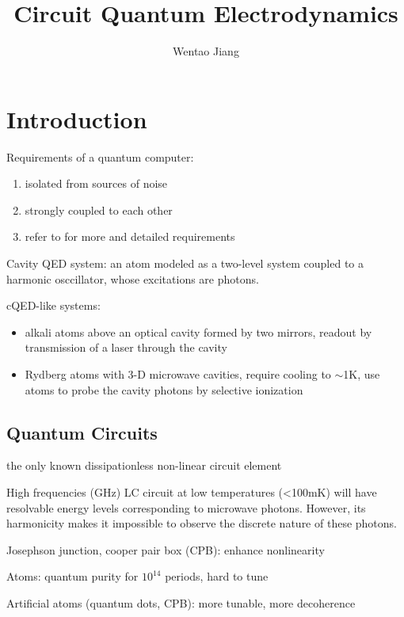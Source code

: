 \documentclass[8pt,a4paper,twocolumn]{article} %
\numberwithin{equation}{section} %
\begin{document}
\small
	\title{Circuit Quantum Electrodynamics}
	\author{Wentao Jiang}
	\date{}
	\maketitle
	\tableofcontents
	\section{Introduction} %
	\label{sec:introduction}
		Requirements of a quantum computer:
		\begin{enumerate}
    		\setlength{\itemsep}{1pt}
    		\setlength{\parsep}{1pt}
    		\setlength{\parskip}{1pt}
			\item isolated from sources of noise
			\item strongly coupled to each other
			\item refer to \cite{DiVincenzo2000} for more and detailed requirements
		\end{enumerate}
		Cavity QED system: an atom modeled as a two-level system coupled to a harmonic osccillator, whose excitations are photons.

		cQED-like systems: 
		\begin{itemize}
			\item alkali atoms above an optical cavity formed by two mirrors, readout by transmission of a laser through the cavity
			\item Rydberg atoms with 3-D microwave cavities, require cooling to $\sim$1K, use atoms to probe the cavity photons by selective ionization
		\end{itemize}

		\subsection{Quantum Circuits} %
		\label{sub:quantum_circuits}
			the only known dissipationless non-linear circuit element

			High frequencies (GHz) LC circuit at low temperatures (<100mK) will have resolvable energy levels corresponding to microwave photons. However, its harmonicity makes it impossible to observe the discrete nature of these photons.

			Josephson junction, cooper pair box (CPB): enhance nonlinearity

			Atoms: quantum purity for $10^{14}$ periods, hard to tune

			Artificial atoms (quantum dots, CPB): more tunable, more decoherence
\end{document}
